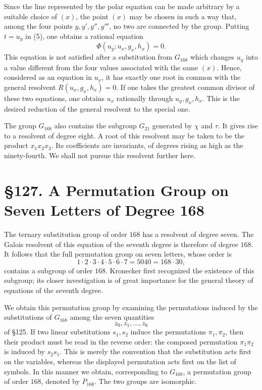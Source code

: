\documentclass[12pt,a4paper]{article}
\newcommand{\webersection}[2]{\clearpage\section*{\S #1. #2}}
\begin{document}
Since the line represented by the polar equation can be made arbitrary by a suitable choice of \((x)\), the point \((x)\) may be chosen in such a way that, among the four points \(y,y',y'',y'''\), no two are connected by the group.  Putting \(t=u_y\) in (5), one obtains a rational equation
\begin{equation}
 \Phi(u_y;u_x,g_x,h_x)=0. \tag{6}
\end{equation}
This equation is not satisfied after a substitution from \(G_{168}\) which changes \(u_y\) into a value different from the four values associated with the same \((x)\).  Hence, considered as an equation in \(u_x\), it has exactly one root in common with the general resolvent \(R(u_x,g_x,h_x)=0\).  If one takes the greatest common divisor of these two equations, one obtains \(u_x\) rationally through \(u_y,g_x,h_x\).  This is the desired reduction of the general resolvent to the special one.

The group \(G_{168}\) also contains the subgroup \(G_{21}\) generated by \(\chi\) and \(\tau\).  It gives rise to a resolvent of degree eight.  A root of this resolvent may be taken to be the product \(x_1x_2x_3\).  Its coefficients are invariants, of degrees rising as high as the ninety-fourth.  We shall not pursue this resolvent further here.

\webersection{127}{A Permutation Group on Seven Letters of Degree 168}

The ternary substitution group of order \(168\) has a resolvent of degree seven.  The Galois resolvent of this equation of the seventh degree is therefore of degree \(168\).  It follows that the full permutation group on seven letters, whose order is
\[
 1\cdot2\cdot3\cdot4\cdot5\cdot6\cdot7=5040=168\cdot30,
\]
contains a subgroup of order \(168\).  Kronecker first recognized the existence of this subgroup; its closer investigation is of great importance for the general theory of equations of the seventh degree.

We obtain this permutation group by examining the permutations induced by the substitutions of \(G_{168}\) among the seven quantities
\[
 z_0,z_1,\ldots,z_6
\]
of \S 125.  If two linear substitutions \(s_1,s_2\) induce the permutations \(\pi_1,\pi_2\), then their product must be read in the reverse order: the composed permutation \(\pi_1\pi_2\) is induced by \(s_2s_1\).  This is merely the convention that the substitution acts first on the variables, whereas the displayed permutation acts first on the list of symbols.  In this manner we obtain, corresponding to \(G_{168}\), a permutation group of order \(168\), denoted by \(P_{168}\).  The two groups are isomorphic.
\end{document}
